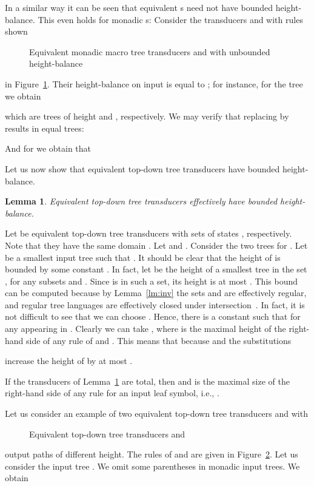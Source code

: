 \documentclass[copyright,creativecommons]{eptcs}
\newtheorem{lemma}{Lemma}
\newcommand{\eop}{\hspace*{\fill}}
\newenvironment{proof}{{\it Proof.}\quad}{\eop\vspace*{4mm}}
\begin{document}
In a similar way it can be seen that equivalent s need
not have bounded height-balance.
This even holds for monadic s:
Consider the transducers  and  with rules shown
\begin{figure}[htb]

\caption{Equivalent monadic macro tree transducers  and 
with unbounded height-balance}\label{fig:mon}
\end{figure}
in Figure~\ref{fig:mon}.
Their height-balance on input  is equal to ; for instance,
for the tree  we obtain

which are trees of height  and , respectively.
We may verify that replacing  by  results in equal trees:

And for  we obtain that


Let us now show that equivalent top-down tree transducers 
have bounded height-balance.

\begin{lemma}\rm\label{lm:bd}
Equivalent top-down tree transducers
effectively have bounded height-balance.
\end{lemma}
\begin{proof}
Let  be equivalent top-down tree transducers 
with sets of states , respectively.
Note that they have the same domain .
Let  and .
Consider the two trees 
 for .
Let  be a smallest input tree such that 
.
It should be clear that the height of  is bounded
by some constant . 
In fact, let  be the height of a smallest tree in the
set ,
for any subsets  and . 
Since  is in such a set, its height is at most .
This bound  can be computed because by Lemma~\ref{lm:inv}
the sets  and 
are effectively regular, and regular
tree languages are effectively closed under intersection~\cite{tata07}.
In fact, it is not difficult to see that we can choose
.
Hence, there is a constant  such that 
 for any 
appearing in . 
Clearly we can take , where  is the maximal height
of the right-hand side of any rule of  and .
This means that  because
 and the substitutions

increase the height of  by at most .
\end{proof}

If the transducers  of Lemma~\ref{lm:bd} are
total, then  and  is the maximal size of the right-hand
side of any rule for an input leaf symbol, i.e., 
.

Let us consider an example of two equivalent 
top-down tree transducers  and  with
\begin{figure}[htb]

\caption{Equivalent top-down tree transducers  and }\label{fig:diff}
\end{figure}
output paths of different height.
The rules of  and  are given in Figure~\ref{fig:diff}.
Let us consider the input tree . We omit some
parentheses in monadic input trees.
We obtain
\end{document}

